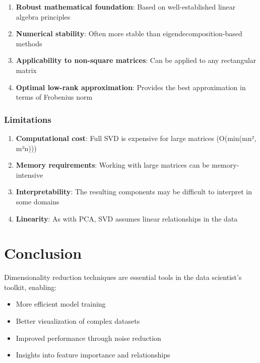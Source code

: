 \documentclass[
  letterpaper,
  DIV=11,
  numbers=noendperiod]{scrreprt}
\providecommand{\tightlist}{%
  \setlength{\itemsep}{0pt}\setlength{\parskip}{0pt}}\usepackage{longtable,booktabs,array}
\begin{document}
\begin{enumerate}
\def\labelenumi{\arabic{enumi}.}
\tightlist
\item
  \textbf{Robust mathematical foundation}: Based on well-established
  linear algebra principles
\item
  \textbf{Numerical stability}: Often more stable than
  eigendecomposition-based methods
\item
  \textbf{Applicability to non-square matrices}: Can be applied to any
  rectangular matrix
\item
  \textbf{Optimal low-rank approximation}: Provides the best
  approximation in terms of Frobenius norm
\end{enumerate}

\subsubsection{Limitations}\label{limitations}

\begin{enumerate}
\def\labelenumi{\arabic{enumi}.}
\tightlist
\item
  \textbf{Computational cost}: Full SVD is expensive for large matrices
  (O(min(mn², m²n)))
\item
  \textbf{Memory requirements}: Working with large matrices can be
  memory-intensive
\item
  \textbf{Interpretability}: The resulting components may be difficult
  to interpret in some domains
\item
  \textbf{Linearity}: As with PCA, SVD assumes linear relationships in
  the data
\end{enumerate}

\section{Conclusion}\label{conclusion}

Dimensionality reduction techniques are essential tools in the data
scientist's toolkit, enabling:

\begin{itemize}
\tightlist
\item
  More efficient model training
\item
  Better visualization of complex datasets
\item
  Improved performance through noise reduction
\item
  Insights into feature importance and relationships
\end{itemize}
\end{document}
